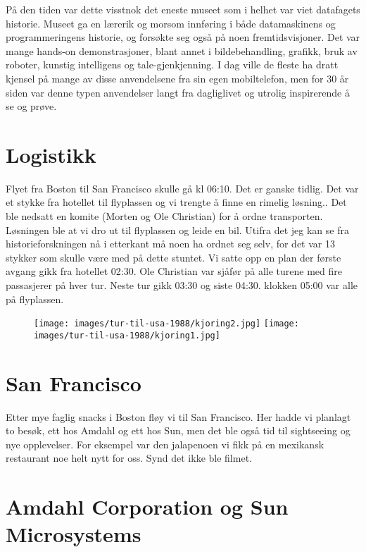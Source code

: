 På den tiden var dette visstnok det eneste museet som i helhet var viet datafagets historie. Museet ga en lærerik og morsom innføring i både datamaskinens og programmeringens historie, og forsøkte seg også på noen fremtidsvisjoner. Det var mange hands-on demonstrasjoner, blant annet i bildebehandling, grafikk, bruk av roboter, kunstig intelligens og tale-gjenkjenning. I dag ville de fleste ha dratt kjensel på mange av disse anvendelsene fra sin egen mobiltelefon, men for 30 år siden var denne typen anvendelser langt fra dagliglivet og utrolig inspirerende å se og prøve.

\section{Logistikk}

Flyet fra Boston til San Francisco skulle gå kl 06:10. Det er ganske tidlig. Det var et stykke fra hotellet til flyplassen og vi trengte å finne en rimelig løsning.. Det ble nedsatt en komite (Morten og Ole Christian) for å ordne transporten. Løsningen ble at vi dro ut til flyplassen og leide en bil. Utifra det jeg kan se fra historieforskningen nå i etterkant må noen ha ordnet seg selv, for det var 13 stykker som skulle være med på dette stuntet. Vi satte opp en plan der første avgang gikk fra hotellet 02:30. Ole Christian var sjåfør på alle turene med fire passasjerer på hver tur. Neste tur gikk 03:30 og siste 04:30. klokken 05:00 var alle på flyplassen.

\begin{figure}
	\texttt{[image: images/tur-til-usa-1988/kjoring2.jpg]}
	\texttt{[image: images/tur-til-usa-1988/kjoring1.jpg]}
\end{figure}

\section{San Francisco}

Etter mye faglig snacks i Boston fløy vi til San Francisco. Her hadde vi planlagt to besøk, ett hos Amdahl og ett hos Sun, men det ble også tid til sightseeing og nye opplevelser. For eksempel var den jalapenoen vi fikk på en mexikansk restaurant noe helt nytt for oss. Synd det ikke ble filmet.

\section{Amdahl Corporation og Sun Microsystems}

